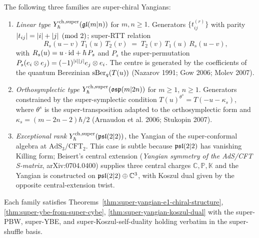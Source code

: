 \begin{theorem}
\label{thm:super-yangian-landscape}
The following three families are super-chiral Yangians:
\begin{enumerate}[label=\textup{(\roman*)}]
\item \emph{Linear type} $Y^{\mathrm{ch},\mathrm{super}}_{\hbar}(\mathfrak{gl}(m|n))$ for $m,n\ge 1$.
 Generators $\{t_{ij}^{(r)}\}$ with parity
 $|t_{ij}| = |i|+|j|\pmod 2$; super-RTT relation
 \begin{equation}
 \label{eq:super-rtt}
 R_s(u-v)\,T_1(u)\,T_2(v)\;=\;T_2(v)\,T_1(u)\,R_s(u-v),
 \end{equation}
 with $R_s(u) = u\cdot \mathrm{id} + \hbar\,P_s$ and $P_s$ the super-permutation
 $P_s(e_i\otimes e_j) = (-1)^{|i||j|} e_j\otimes e_i$.
 The centre is generated by the coefficients of the quantum Berezinian
 $\operatorname{sBer}_q(T(u))$ (Nazarov 1991; Gow 2006; Molev 2007).
\item \emph{Orthosymplectic type} $Y^{\mathrm{ch},\mathrm{super}}_{\hbar}(\mathfrak{osp}(m|2n))$ for
 $m\ge 1$, $n\ge 1$. Generators constrained by the super-symplectic
 condition $T(u)^{\theta^s} = T(-u-\kappa_s)$, where $\theta^s$ is the
 super-transposition adapted to the orthosymplectic form and
 $\kappa_s = (m-2n-2)\hbar/2$ (Arnaudon et al. 2006; Stukopin 2007).
\item \emph{Exceptional rank} $Y^{\mathrm{ch},\mathrm{super}}_{\hbar}(\mathfrak{psl}(2|2))$, the
 Yangian of the super-conformal algebra at
 $\mathrm{AdS}_3/\mathrm{CFT}_2$. This case is subtle because
 $\mathfrak{psl}(2|2)$ has vanishing Killing form; Beisert's central extension
 (\emph{Yangian symmetry of the AdS/CFT S-matrix}, arXiv:0704.0400)
 supplies three central charges $\mathbb{C}, \mathbb{P}, \mathbb{K}$
 and the Yangian is constructed on
 $\mathfrak{psl}(2|2)\oplus\mathbb{C}^3$, with Koszul dual given by
 the opposite central-extension twist.
\end{enumerate}
Each family satisfies Theorems~\ref{thm:super-yangian-e1-chiral-structure},
\ref{thm:super-ybe-from-super-cybe}, \ref{thm:super-yangian-koszul-dual}
with the super-PBW, super-YBE, and super-Koszul-self-duality holding
verbatim in the super-shuffle basis.
\end{theorem}

